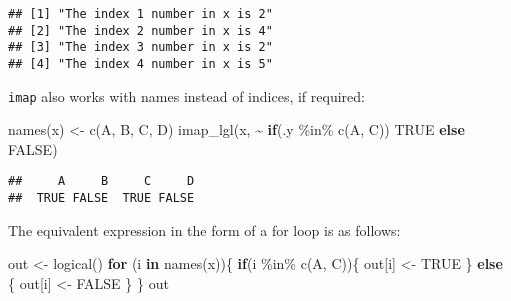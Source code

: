 \documentclass[
]{book}
\newenvironment{Shaded}{\begin{snugshade}}{\end{snugshade}}
\newcommand{\ConstantTok}[1]{\textcolor[rgb]{0.00,0.00,0.00}{#1}}
\newcommand{\ControlFlowTok}[1]{\textcolor[rgb]{0.13,0.29,0.53}{\textbf{#1}}}
\newcommand{\FunctionTok}[1]{\textcolor[rgb]{0.00,0.00,0.00}{#1}}
\newcommand{\NormalTok}[1]{#1}
\newcommand{\OtherTok}[1]{\textcolor[rgb]{0.56,0.35,0.01}{#1}}
\newcommand{\SpecialCharTok}[1]{\textcolor[rgb]{0.00,0.00,0.00}{#1}}
\newcommand{\StringTok}[1]{\textcolor[rgb]{0.31,0.60,0.02}{#1}}
\begin{document}
\begin{verbatim}
## [1] "The index 1 number in x is 2"
## [2] "The index 2 number in x is 4"
## [3] "The index 3 number in x is 2"
## [4] "The index 4 number in x is 5"
\end{verbatim}

\texttt{imap} also works with names instead of indices, if required:

\begin{Shaded}
\begin{Highlighting}[]
\FunctionTok{names}\NormalTok{(x) }\OtherTok{\textless{}{-}} \FunctionTok{c}\NormalTok{(}\StringTok{\textquotesingle{}A\textquotesingle{}}\NormalTok{, }\StringTok{\textquotesingle{}B\textquotesingle{}}\NormalTok{, }\StringTok{\textquotesingle{}C\textquotesingle{}}\NormalTok{, }\StringTok{\textquotesingle{}D\textquotesingle{}}\NormalTok{)}
\FunctionTok{imap\_lgl}\NormalTok{(x, }\SpecialCharTok{\textasciitilde{}} \ControlFlowTok{if}\NormalTok{(.y }\SpecialCharTok{\%in\%} \FunctionTok{c}\NormalTok{(}\StringTok{\textquotesingle{}A\textquotesingle{}}\NormalTok{, }\StringTok{\textquotesingle{}C\textquotesingle{}}\NormalTok{)) }\ConstantTok{TRUE} \ControlFlowTok{else} \ConstantTok{FALSE}\NormalTok{)}
\end{Highlighting}
\end{Shaded}

\begin{verbatim}
##     A     B     C     D 
##  TRUE FALSE  TRUE FALSE
\end{verbatim}

The equivalent expression in the form of a for loop is as follows:

\begin{Shaded}
\begin{Highlighting}[]
\NormalTok{out }\OtherTok{\textless{}{-}} \FunctionTok{logical}\NormalTok{()}
\ControlFlowTok{for}\NormalTok{ (i }\ControlFlowTok{in} \FunctionTok{names}\NormalTok{(x))\{}
  \ControlFlowTok{if}\NormalTok{(i }\SpecialCharTok{\%in\%} \FunctionTok{c}\NormalTok{(}\StringTok{\textquotesingle{}A\textquotesingle{}}\NormalTok{, }\StringTok{\textquotesingle{}C\textquotesingle{}}\NormalTok{))\{}
\NormalTok{    out[i] }\OtherTok{\textless{}{-}} \ConstantTok{TRUE}
\NormalTok{  \} }\ControlFlowTok{else}\NormalTok{ \{}
\NormalTok{    out[i] }\OtherTok{\textless{}{-}} \ConstantTok{FALSE}
\NormalTok{  \}}
\NormalTok{\}}
\NormalTok{out}
\end{Highlighting}
\end{Shaded}
\end{document}
